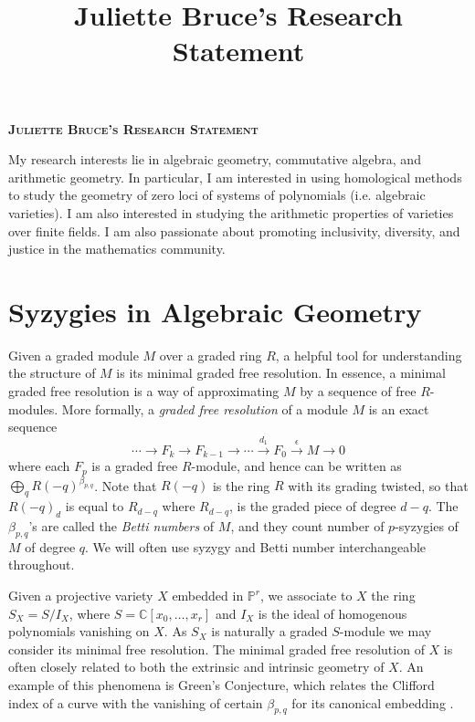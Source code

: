 \documentclass[11pt,reqno]{amsart}
\title{Juliette Bruce's Research Statement}
\theoremstyle{remark}
\newcommand{\C}{\mathbb{C}}
\renewcommand{\P}{\mathbb{P}}
\begin{document}
 

\begingroup  
  \centering
  \large\scshape\bfseries Juliette Bruce's Research Statement\\[1em]
\endgroup


\setcounter{section}{0}

My research interests lie in algebraic geometry, commutative algebra, and arithmetic geometry. In particular, I am interested in using homological methods to study the geometry of zero loci of systems of polynomials (i.e. algebraic varieties). I am also interested in studying the arithmetic properties of varieties over finite fields. I am also passionate about promoting inclusivity, diversity, and justice in the mathematics community.

\section{Syzygies in Algebraic Geometry}

Given a graded module $M$ over a graded ring $R$, a helpful tool for understanding the structure of $M$ is its minimal graded free resolution. In essence, a minimal graded free resolution is a way of approximating $M$ by a sequence of free $R$-modules. More formally, a \textit{graded free resolution} of a module $M$ is an exact sequence 
\[
\cdots \xrightarrow{} F_{k} \xrightarrow{} F_{k-1} \xrightarrow{} \cdots \xrightarrow{d_{1}} F_{0}\xrightarrow{\epsilon}M\xrightarrow{} 0
\]
where each $F_{p}$ is a graded free $R$-module, and hence can be written as $\bigoplus_{q}R(-q)^{\beta_{p,q}}$. Note that $R(-q)$ is the ring $R$ with its grading twisted, so that $R(-q)_{d}$ is equal to $R_{d-q}$ where $R_{d-q}$, is the graded piece of degree $d-q$. The $\beta_{p,q}$'s are called the \textit{Betti numbers} of $M$, and they count number of $p$-syzygies of $M$ of degree $q$. We will often use syzygy and Betti number interchangeable throughout. 

Given a projective variety $X$ embedded in $\P^r$, we associate to $X$ the ring $S_X=S/I_X$, where $S=\C[x_0,\ldots,x_r]$ and $I_X$ is the ideal of homogenous polynomials vanishing on $X$. As $S_X$ is naturally a graded $S$-module we may consider its minimal free resolution. The minimal graded free resolution of $X$ is often closely related to both the extrinsic and intrinsic geometry of $X$.  An example of this phenomena
 is Green's Conjecture, which relates the Clifford index of a curve with the vanishing of certain $\beta_{p,q}$ for its canonical embedding \cite{voisin02, voisin05, aproduFarkas19}.
\end{document}

